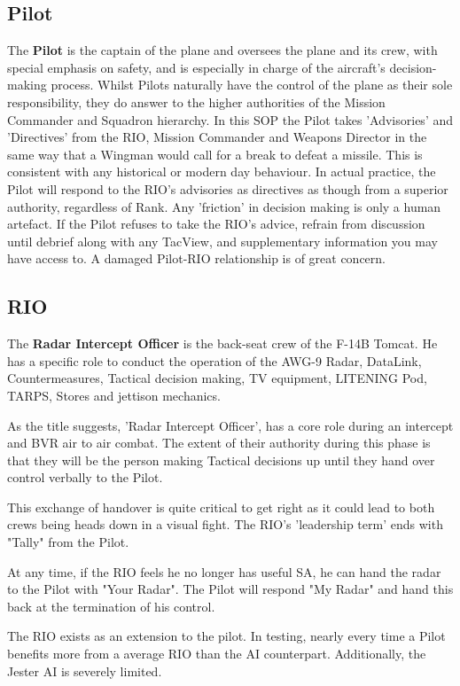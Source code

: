 \subsection*{Pilot}

The \textbf{Pilot} is the captain of the plane and oversees the plane and its
crew, with special emphasis on safety, and is especially in charge of the
aircraft's decision-making process. Whilst Pilots naturally have the control of
the plane as their sole responsibility, they do answer to the higher authorities
of the Mission Commander and Squadron hierarchy. In this SOP the Pilot takes
'Advisories' and 'Directives' from the RIO, Mission Commander and Weapons
Director in the same way that a Wingman would call for a break to defeat a
missile. This is consistent with any historical or modern day behaviour. In
actual practice, the Pilot will respond to the RIO's advisories as directives as
though from a superior authority, regardless of Rank. Any 'friction' in decision
making is only a human artefact. If the Pilot refuses to take the RIO's advice,
refrain from discussion until debrief along with any TacView, and supplementary
information you may have access to. A damaged Pilot-RIO relationship is of great
concern.

\subsection*{RIO}

The \textbf{Radar Intercept Officer} is the back-seat crew of the F-14B Tomcat.
He has a specific role to conduct the operation of the AWG-9 Radar, DataLink,
Countermeasures, Tactical decision making, TV equipment, LITENING Pod, TARPS,
Stores and jettison mechanics.

As the title suggests, 'Radar Intercept Officer', has a core role during an
intercept and BVR air to air combat. The extent of their authority during this
phase is that they will be the person making Tactical decisions up until they
hand over control verbally to the Pilot.

This exchange of handover is quite critical to get right as it could lead to
both crews being heads down in a visual fight. The RIO's 'leadership term' ends
with "Tally" from the Pilot.

At any time, if the RIO feels he no longer has useful SA, he can hand the radar
to the Pilot with "Your Radar". The Pilot will respond "My Radar" and hand this
back at the termination of his control.

The RIO exists as an extension to the pilot. In testing, nearly every time a
Pilot benefits more from a average RIO than the AI counterpart. Additionally,
the Jester AI is severely limited.

